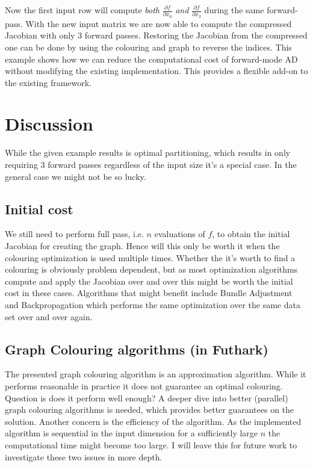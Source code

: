 Now the first input row will compute \emph{both} $\frac{\partial f}{\partial x_0}$
\emph{and} $\frac{\partial f}{\partial x_3}$ during the same forward-pass.
With the new input matrix we are now able to compute the compressed Jacobian
with only 3 forward passes. Restoring the Jacobian from the compressed one
can be done by using the colouring and graph to reverse the indices. This example
shows how we can reduce the computational cost of forward-mode AD without 
modifying the existing implementation. This provides a flexible add-on 
to the existing framework. 


\section{Discussion}
While the given example results is optimal partitioning, which results in 
only requiring 3 forward passes regardless of the input size
it's a special case. In the general case we might not be so lucky. 
\subsection*{Initial cost}
We still need to perform full pass, i.e. $n$ evaluations of $f$, to obtain the 
initial Jacobian for creating the graph. Hence will this only be 
worth it when the colouring optimization is used multiple times. 
Whether the it's worth to find a colouring is obviously
problem dependent, but as most optimization
algorithms compute and apply the Jacobian over and over 
this might be worth the initial cost in these cases. Algorithms that might benefit 
include Bundle Adjustment and Backpropagation which performs the same optimization 
over the same data set over and over again. 

\subsection*{Graph Colouring algorithms (in Futhark)} 
The presented graph colouring algorithm is an approximation algorithm.
While it performs reasonable in practice it does not guarantee an optimal
colouring. Question is does it perform well enough? A deeper dive into
better (parallel) graph colouring algorithms is needed, which provides better guarantees 
on the solution. Another concern is the efficiency of the algorithm. As
the implemented algorithm is sequential in the input dimension for a
sufficiently large $n$ the computational time might become too large. 
I will leave this for future work to investigate these two issues in more depth. 


